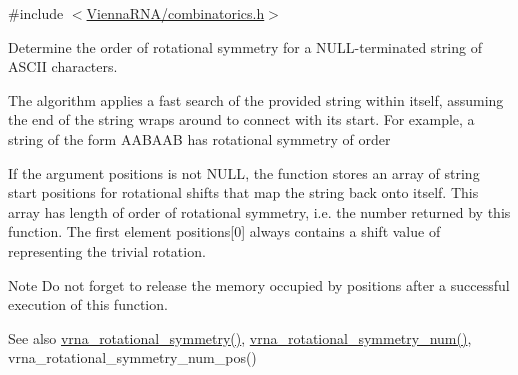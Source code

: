 {\ttfamily \#include $<$\mbox{\hyperlink{combinatorics_8h}{Vienna\+R\+N\+A/combinatorics.\+h}}$>$}



Determine the order of rotational symmetry for a N\+U\+L\+L-\/terminated string of A\+S\+C\+II characters. 

The algorithm applies a fast search of the provided string within itself, assuming the end of the string wraps around to connect with it\textquotesingle{}s start. For example, a string of the form {\ttfamily A\+A\+B\+A\+AB} has rotational symmetry of order {} 

If the argument {\ttfamily positions} is not {\ttfamily N\+U\+LL}, the function stores an array of string start positions for rotational shifts that map the string back onto itself. This array has length of order of rotational symmetry, i.\+e. the number returned by this function. The first element {\ttfamily positions}\mbox{[}0\mbox{]} always contains a shift value of {} representing the trivial rotation.

\begin{DoxyNote}{Note}
Do not forget to release the memory occupied by {\ttfamily positions} after a successful execution of this function.
\end{DoxyNote}
\begin{DoxySeeAlso}{See also}
\mbox{\hyperlink{group__combinatorics__utils_gae1dec02c4b63f303ce06a9293d316762}{vrna\+\_\+rotational\+\_\+symmetry()}}, \mbox{\hyperlink{group__combinatorics__utils_gac51464b5281833a58c25f9447252c495}{vrna\+\_\+rotational\+\_\+symmetry\+\_\+num()}}, vrna\+\_\+rotational\+\_\+symmetry\+\_\+num\+\_\+pos()
\end{DoxySeeAlso}

